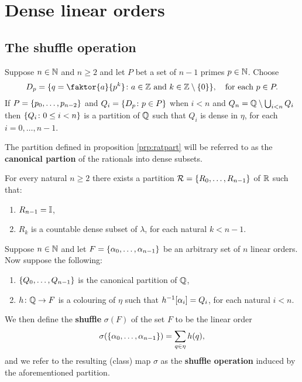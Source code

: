 \chapter{Dense linear orders}


\section{The shuffle operation}

\begin{prp}\label{prp:ratpart}
	Suppose $n\in\mathbb{N}$ and $n\geq 2$ and let $P$ bet a set of $n-1$ primes $p\in\mathbb{N}$.  Choose
	\begin{equation}
		D_p=\setbuild{q=\faktor{a}{p^k}}{a\in\ints\text{ and }k\in\ints\setminus\set{0}},\quad\text{for each }p\in P.
	\end{equation}
	If $P=\lbrace p_0,\dotsc,p_{n-2}\rbrace$ and $Q_i=\lbrace D_p\colon p\in P \rbrace$ when $i<n$ and $Q_n=\mathbb{Q}\setminus\bigcup_{i<n}Q_i$ then $\lbrace Q_i\colon 0\leq i<n \rbrace$ is a partition of $\mathbb{Q}$ such that $Q_i$ is dense in $\eta$, for each $i=0,\dotsc,n-1$.
\end{prp}

\begin{dfn}
	The partition defined in proposition \ref{prp:ratpart} will be referred to as the \textbf{canonical partion} of the rationals into dense subsets.
\end{dfn}

\begin{cor}
	For every natural $n\geq 2$ there exists a partition $\mathcal{R}=\lbrace R_0,\dotsc,R_{n-1}\rbrace$ of $\mathbb{R}$ such that:
	\begin{enumerate}
		\item $R_{n-1}=\mathbb{I}$,
		\item $R_k$ is a countable dense subset of $\lambda$, for each natural $k<n-1$.
	\end{enumerate}
\end{cor}

\begin{dfn}
	Suppose $n\in\mathbb{N}$ and let $F=\lbrace \alpha_0,\dotsc,\alpha_{n-1}\rbrace$ be an arbitrary set of $n$ linear orders.  Now suppose the following:
	\begin{enumerate}
		\item $\lbrace Q_0,\dotsc,Q_{n-1}\rbrace$ is the canonical partition of $\mathbb{Q}$,
		\item $h\colon\mathbb{Q}\to F$ is a colouring of $\eta$ such that ${h}^{-1}[\alpha_i]=Q_i$, for each natural $i<n$.
	\end{enumerate}
	We then define the \textbf{shuffle} $\sigma(F)$ of the set $F$ to be the linear order
	\begin{equation}
		\sigma(\lbrace \alpha_0,\dotsc,\alpha_{n-1}\rbrace)=\sum_{q\in\eta}h(q),
	\end{equation}
	and we refer to the resulting (class) map $\sigma$ as the \textbf{shuffle operation} induced by the aforementioned partition.
\end{dfn}


